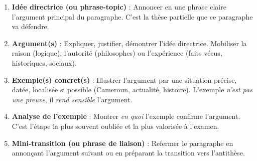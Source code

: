 \documentclass[11pt]{article}
\newcommand{\cle}[1]{{\popxbold\color{popdark}#1}}
\begin{document}
\begin{methode}
\begin{enumerate}
    \item \textbf{Idée directrice (ou phrase-topic)} : Annoncer en une phrase claire l'argument principal du paragraphe. C'est la \cle{thèse partielle} que ce paragraphe va défendre.
    \item \textbf{Argument(s)} : Expliquer, justifier, démontrer l'idée directrice. Mobiliser la raison (logique), l'autorité (philosophes) ou l'expérience (faits vécus, historiques, sociaux).
    \item \textbf{Exemple(s) concret(s)} : Illustrer l'argument par une situation précise, datée, localisée si possible (Cameroun, actualité, histoire). L'exemple \emph{n'est pas une preuve}, il \emph{rend sensible} l'argument.
    \item \textbf{Analyse de l'exemple} : Montrer \emph{en quoi} l'exemple confirme l'argument. C'est l'étape la plus souvent oubliée et la plus valorisée à l'examen.
    \item \textbf{Mini-transition (ou phrase de liaison)} : Refermer le paragraphe en annonçant l'argument suivant ou en préparant la transition vers l'antithèse.
\end{enumerate}
\end{methode}
\end{document}
